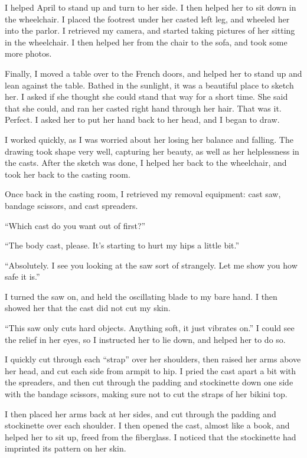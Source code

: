 I helped April to stand up and turn to her side. I then helped her to sit down in the
wheelchair. I placed the footrest under her casted left leg, and wheeled her into the parlor. I
retrieved my camera, and started taking pictures of her sitting in the wheelchair. I then helped
her from the chair to the sofa, and took some more photos.

Finally, I moved a table over to the French doors, and helped her to stand up and lean against
the table. Bathed in the sunlight, it was a beautiful place to sketch her. I asked if she
thought she could stand that way for a short time. She said that she could, and ran her casted
right hand through her hair. That was it. Perfect. I asked her to put her hand back to her head,
and I began to draw.

I worked quickly, as I was worried about her losing her balance and falling. The drawing took
shape very well, capturing her beauty, as well as her helplessness in the casts. After the
sketch was done, I helped her back to the wheelchair, and took her back to the casting room.

Once back in the casting room, I retrieved my removal equipment: cast saw, bandage scissors, and
cast spreaders.

``Which cast do you want out of first?''

``The body cast, please. It's starting to hurt my hips a little bit.''

``Absolutely. I see you looking at the saw sort of strangely. Let me show you how safe it is.''

I turned the saw on, and held the oscillating blade to my bare hand. I then showed her that the
cast did not cut my skin.

``This saw only cuts hard objects. Anything soft, it just vibrates on.'' I could see the relief
in her eyes, so I instructed her to lie down, and helped her to do so.

I quickly cut through each ``strap'' over her shoulders, then raised her arms above her head,
and cut each side from armpit to hip. I pried the cast apart a bit with the spreaders, and then
cut through the padding and stockinette down one side with the bandage scissors, making sure not
to cut the straps of her bikini top.

I then placed her arms back at her sides, and cut through the padding and stockinette over each
shoulder. I then opened the cast, almost like a book, and helped her to sit up, freed from the
fiberglass. I noticed that the stockinette had imprinted its pattern on her skin.

